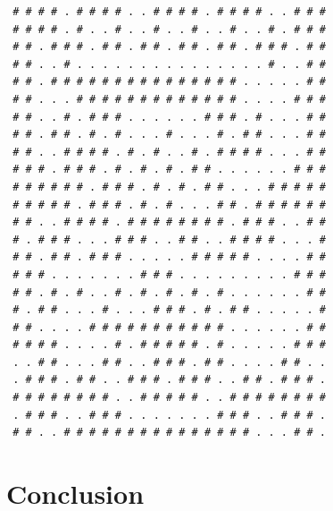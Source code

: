\documentclass[12pt, letterpaper]
{article}
\begin{document}
\begin{lstlisting}
 # # # # . # # # # . . # # # # . # # # # . . # # #
 # # # # . # . . # . . # . . # . . # . . # . # # #
 # # . # # # . # # . # # . # # . # # . # # # . # #
 # # . . # . . . . . . . . . . . . . . . # . . # #
 # # . # # # # # # # # # # # # # # # . . . . . # #
 # # . . . # # # # # # # # # # # # # . . . . # # #
 # # . . # . # # # . . . . . . # # # . # . . . # #
 # # . # # . # . # . . . # . . . # . # # . . . # #
 # # . . # # # # . # . # . . # . # # # # . . . # #
 # # # . # # # . # . # . # . # # . . . . . . # # #
 # # # # # # . # # # . # . # . # # . . . # # # # #
 # # # # # . # # # . # . # . . . # # . # # # # # #
 # # . . # # # # . # # # # # # # # . # # # . . # #
 # . # # # . . . # # # . . # # . . # # # # . . . #
 # # . # # . # # # . . . . . # # # # # . . . . # #
 # # # . . . . . . . # # # . . . . . . . . . # # #
 # # . # . # . . # . # . # . # . # . . . . . . # #
 # . # # . . . # . . . # # # . # . # # . . . . . #
 # # . . . . # # # # # # # # # # # . . . . . . # #
 # # # # . . . . # . # # # # # . # . . . . . # # #
 . . # # . . . # # . . # # # . # # . . . . # # . .
 . # # # . # # . . # # # . # # # . . # # . # # # .
 # # # # # # # # . . # # # # # . . # # # # # # # #
 . # # # . . # # # . . . . . . . # # # . . # # # .
 # # . . # # # # # # # # # # # # # # # . . . # # .
\end{lstlisting}

\section{Conclusion}


% 

% 




\end{document}
